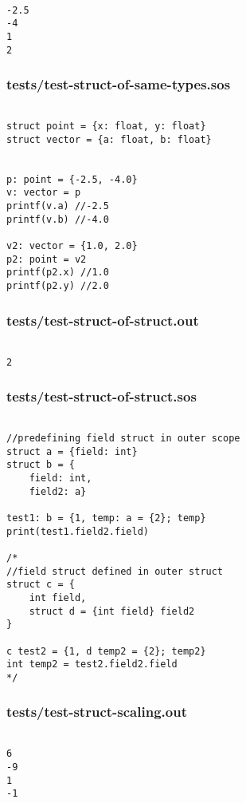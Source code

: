\documentclass[main.tex]{subfiles}
\begin{document}
\begin{lstlisting}

-2.5
-4
1
2
\end{lstlisting}

\subsubsection{tests/test-struct-of-same-types.sos}

\begin{lstlisting}

struct point = {x: float, y: float}
struct vector = {a: float, b: float}


p: point = {-2.5, -4.0}
v: vector = p
printf(v.a) //-2.5
printf(v.b) //-4.0

v2: vector = {1.0, 2.0}
p2: point = v2
printf(p2.x) //1.0
printf(p2.y) //2.0
\end{lstlisting}

\subsubsection{tests/test-struct-of-struct.out}

\begin{lstlisting}

2
\end{lstlisting}

\subsubsection{tests/test-struct-of-struct.sos}

\begin{lstlisting}

//predefining field struct in outer scope
struct a = {field: int}
struct b = { 
    field: int,
    field2: a}

test1: b = {1, temp: a = {2}; temp}
print(test1.field2.field)

/*
//field struct defined in outer struct
struct c = {
    int field,
    struct d = {int field} field2
}

c test2 = {1, d temp2 = {2}; temp2}
int temp2 = test2.field2.field
*/
\end{lstlisting}

\subsubsection{tests/test-struct-scaling.out}

\begin{lstlisting}

6
-9
1
-1
\end{lstlisting}
\end{document}
